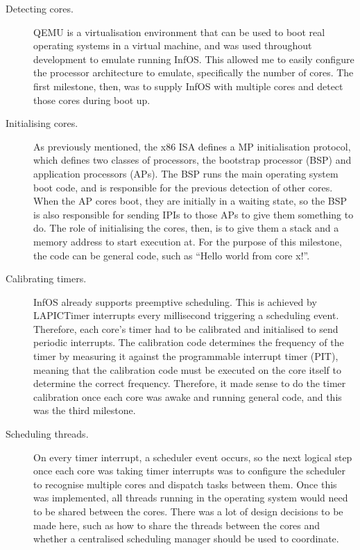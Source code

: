 \documentclass[bsc,frontabs,singlespacing,parskip,deptreport]{infthesis}     %
\begin{document}
\begin{description}
\item [Detecting cores.] QEMU \cite{qemu} is a virtualisation environment that can be used to boot real operating systems in a virtual machine, and was used throughout development to emulate running InfOS. This allowed me to easily configure the processor architecture to emulate, specifically the number of cores. The first milestone, then, was to supply InfOS with multiple cores and detect those cores during boot up.

\item [Initialising cores.] As previously mentioned, the x86 ISA defines a MP initialisation protocol, which defines two classes of processors, the bootstrap processor (BSP) and application processors (APs). The BSP runs the main operating system boot code, and is responsible for the previous detection of other cores. When the AP cores boot, they are initially in a waiting state, so the BSP is also responsible for sending IPIs to those APs to give them something to do. The role of initialising the cores, then, is to give them a stack and a memory address to start execution at. For the purpose of this milestone, the code can be general code, such as “Hello world from core x!”.

\item[Calibrating timers.] InfOS already supports preemptive scheduling. This is achieved by LAPICTimer interrupts every millisecond triggering a scheduling event. Therefore, each core’s timer had to be calibrated and initialised to send periodic interrupts. The calibration code determines the frequency of the timer by measuring it against the programmable interrupt timer (PIT), meaning that the calibration code must be executed on the core itself to determine the correct frequency. Therefore, it made sense to do the timer calibration once each core was awake and running general code, and this was the third milestone.  

\item[Scheduling threads.] On every timer interrupt, a scheduler event occurs, so the next logical step once each core was taking timer interrupts was to configure the scheduler to recognise multiple cores and dispatch tasks between them. Once this was implemented, all threads running in the operating system would need to be shared between the cores. There was a lot of design decisions to be made here, such as how to share the threads between the cores and whether a centralised scheduling manager should be used to coordinate.
\end{description}
\end{document}
